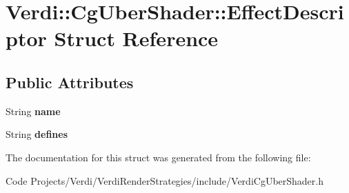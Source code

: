 \section{\-Verdi\-:\-:\-Cg\-Uber\-Shader\-:\-:\-Effect\-Descriptor \-Struct \-Reference}
\label{struct_verdi_1_1_cg_uber_shader_1_1_effect_descriptor}
\subsection*{\-Public \-Attributes}
\begin{DoxyCompactItemize}
\item 
\-String {\bfseries name}\label{struct_verdi_1_1_cg_uber_shader_1_1_effect_descriptor_ace30d3b7317944a532c9c76db4f9c8fb}

\item 
\-String {\bfseries defines}\label{struct_verdi_1_1_cg_uber_shader_1_1_effect_descriptor_a9aeb1c0fbfddb50231722c34242158ce}

\end{DoxyCompactItemize}


\-The documentation for this struct was generated from the following file\-:\begin{DoxyCompactItemize}
\item 
\-Code Projects/\-Verdi/\-Verdi\-Render\-Strategies/include/\-Verdi\-Cg\-Uber\-Shader.\-h\end{DoxyCompactItemize}
